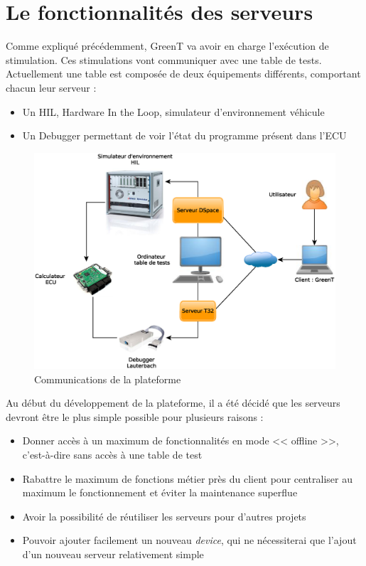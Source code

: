 \section{Le fonctionnalités des serveurs}
Comme expliqué précédemment, GreenT va avoir en charge l'exécution de stimulation. Ces stimulations vont communiquer avec une table de
tests. Actuellement une table est composée de deux équipements différents, comportant chacun leur serveur : 
\begin{itemize}
	\item Un HIL, Hardware In the Loop, simulateur d'environnement véhicule
	\item Un Debugger permettant de voir l'état du programme présent dans l'ECU
\end{itemize}

\begin{figure}[H]
	\centering
	\includegraphics[width=17cm]{contents/images/network.eps}
	\caption{Communications de la plateforme}
\end{figure}

Au début du développement de la plateforme, il a été décidé que les serveurs devront être le plus simple possible pour plusieurs raisons
: 
\begin{itemize}
	\item Donner accès à un maximum de fonctionnalités en mode << offline >>, c'est-à-dire sans accès à une table de test
	\item Rabattre le maximum de fonctions métier près du client pour centraliser au maximum le fonctionnement et éviter la maintenance superflue
	\item Avoir la possibilité de réutiliser les serveurs pour d'autres projets
	\item Pouvoir ajouter facilement un nouveau \textit{device}, qui ne nécessiterai que l'ajout d'un nouveau serveur relativement simple
\end{itemize}

